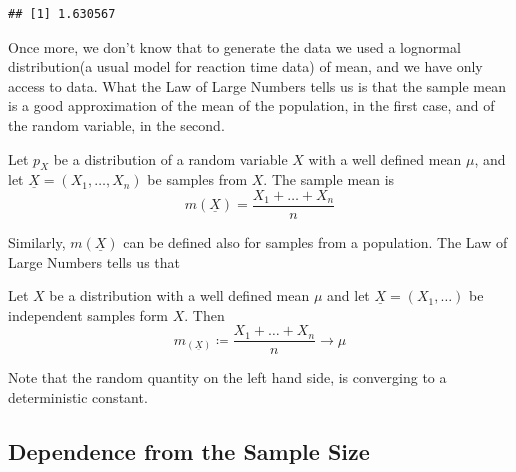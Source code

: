 \begin{knitrout}
\color{fgcolor}\begin{kframe}
\begin{alltt}
 \hlkwb{<-} 
 \hlkwb{<-} 
\end{alltt}
\begin{verbatim}
## [1] 1.630567
\end{verbatim}
\end{kframe}
\end{knitrout}
	Once more, we don't know that to generate the data we used a lognormal distribution(a usual model for reaction time data) of mean, and we have only access to data. 
	What the Law of Large Numbers tells us is that the sample mean is a good approximation of the mean of the population, in the first case, and of the random variable, in the second. 

	\begin{definition}
		\label{d:sample_mean} Let $p_X$ be a distribution of a random variable $X$ with a well defined mean $\mu$, and let  $\underline X = (X_1, \ldots, X_n)$ be samples from $X$. The sample mean is   
			\begin{equation}
				\label{e:sample_mean_x}
				m(\underline X ) = \frac{X_1 + \ldots + X_n }{n}
			\end{equation}
	\end{definition}
	Similarly, $m(\underline X)$ can be defined also for samples from a population. The Law of Large Numbers tells us that 
	\begin{theorem}
		Let $X$ be a distribution with a well defined mean $\mu$ and let $\underline X = (X_1 , \ldots )$ be independent samples form $X$. Then 
			\begin{equation}
			m_(\underline X) \coloneq \frac{X_1 + \ldots + X_n}{n} \to \mu
			\end{equation}
	\end{theorem}
	Note that the random quantity on the left hand side, is converging to a deterministic constant. 
	
	\subsection{ Dependence from the Sample Size}
		
